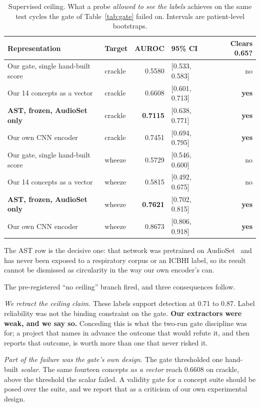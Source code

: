\documentclass[journal,onecolumn]{IEEEtran}
\newcommand{\best}[1]{\textbf{#1}}
\begin{document}
\begin{table}[!t]
\centering
\caption{Supervised ceiling. What a probe \emph{allowed to see the labels}
achieves on the same test cycles the gate of Table~\ref{tab:gate} failed on.
Intervals are patient-level bootstraps.}
\label{tab:ceiling}
\small
\begin{tabular}{llrlr}
\toprule
Representation & Target & AUROC & 95\% CI & Clears 0.65? \\
\midrule
Our gate, single hand-built score & crackle & 0.5580 & [0.533, 0.583] & no \\
Our 14 concepts as a vector       & crackle & 0.6608 & [0.601, 0.713] & \best{yes} \\
\best{AST, frozen, AudioSet only} & crackle & \best{0.7115} & [0.638, 0.771] & \best{yes} \\
Our own CNN encoder               & crackle & 0.7451 & [0.694, 0.795] & \best{yes} \\
\midrule
Our gate, single hand-built score & wheeze  & 0.5729 & [0.546, 0.600] & no \\
Our 14 concepts as a vector       & wheeze  & 0.5815 & [0.492, 0.675] & no \\
\best{AST, frozen, AudioSet only} & wheeze  & \best{0.7621} & [0.702, 0.815] & \best{yes} \\
Our own CNN encoder               & wheeze  & 0.8673 & [0.806, 0.918] & \best{yes} \\
\bottomrule
\end{tabular}

\vspace{2pt}
\footnotesize The AST row is the decisive one: that network was pretrained on
AudioSet~\cite{gemmeke2017audioset} and has never been exposed to a respiratory
corpus or an ICBHI label, so its result cannot be dismissed as circularity in the
way our own encoder's can.
\end{table}

The pre-registered ``no ceiling'' branch fired, and three consequences follow.

\emph{We retract the ceiling claim.} These labels support detection at 0.71 to
0.87. Label reliability was not the binding constraint on the gate. \textbf{Our
extractors were weak, and we say so.} Conceding this is what the two-run gate
discipline was for; a project that names in advance the outcome that would refute
it, and then reports that outcome, is worth more than one that never risked it.

\emph{Part of the failure was the gate's own design.} The gate thresholded one
hand-built \emph{scalar}. The same fourteen concepts \emph{as a vector} reach
0.6608 on crackle, above the threshold the scalar failed. A validity gate for a
concept suite should be posed over the suite, and we report that as a criticism of
our own experimental design.
\end{document}
